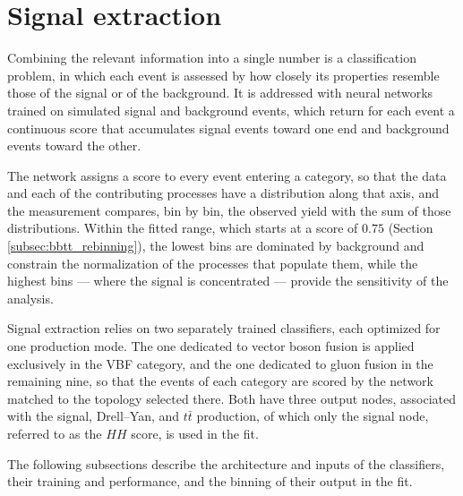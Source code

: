 

\section{Signal extraction}
\label{sec:bbtt_extraction}
%
Combining the relevant information into a single number is a classification problem, in which each event is assessed by how closely its properties resemble those of the signal or of the background. It is addressed with neural networks trained on simulated signal and background events, which return for each event a continuous score that accumulates signal events toward one end and background events toward the other.

The network assigns a score to every event entering a category, so that the data and each of the contributing processes have a distribution along that axis, and the measurement compares, bin by bin, the observed yield with the sum of those distributions. Within the fitted range, which starts at a score of $0.75$ (Section \ref{subsec:bbtt_rebinning}), the lowest bins are dominated by background and constrain the normalization of the processes that populate them, while the highest bins — where the signal is concentrated — provide the sensitivity of the analysis.

Signal extraction relies on two separately trained classifiers, each optimized for one production mode. The one dedicated to vector boson fusion is applied exclusively in the VBF category, and the one dedicated to gluon fusion in the remaining nine, so that the events of each category are scored by the network matched to the topology selected there. Both have three output nodes, associated with the signal, Drell--Yan, and $t\bar{t}$ production, of which only the signal node, referred to as the $HH$ score, is used in the fit.\medskip

The following subsections describe the architecture and inputs of the classifiers, their training and performance, and the binning of their output in the fit.


